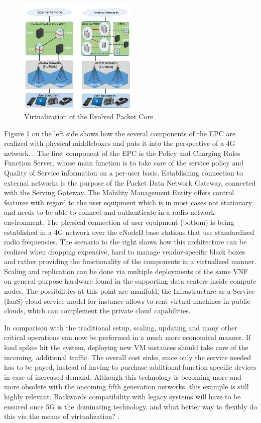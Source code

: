 \begin{figure}[h]
	\centering
	\includegraphics[width=0.5\textwidth]{images/epc_virt.png}
	\caption{Virtualization of the Evolved Packet Core \cite{mijumbi2016network}}
	\label{img:epc_virt}
\end{figure}

Figure \ref{img:epc_virt} on the left side shows how the several components of the EPC are realized with physical middleboxes and puts it into the perspective of a 4G network. . The first component of the EPC is the Policy and Charging Rules Function Server, whose main function is to take care of the service policy and Quality of Service information on a per-user basis. Establishing connection to external networks is the purpose of the Packet Data Network Gateway, connected with the Serving Gateway. The Mobility Management Entity offers control features with regard to the user equipment which is in most cases not stationary and needs to be able to connect and authenticate in a radio network environment. The physical connection of user equipment (bottom) is being established in a 4G network over the eNodeB base stations that use standardized radio frequencies.
The scenario to the right shows how this architecture can be realized when dropping expensive, hard to manage vendor-specific black boxes and rather providing the functionality of the components in a virtualized manner. Scaling and replication can be done via multiple deployments of the same VNF on general purpose hardware found in the supporting data centers inside compute nodes. The possibilities at this point are manifold, the Infrastructure as a Service (IaaS) cloud service model for instance allows to rent virtual machines in public clouds, which can complement the private cloud capabilities. 

In comparison with the traditional setup, scaling, updating and many other critical operations can now be performed in a much more economical manner. If load spikes hit the system, deploying new VM instances should take care of the incoming, additional traffic. The overall cost sinks, since only the service needed has to be payed, instead of having to purchase additional function specific devices in case of increased demand. Although this technology is becoming more and more obsolete with the oncoming fifth generation networks, this example is still highly relevant. Backwards compatibility with legacy systems will have to be ensured once 5G is the dominating technology, and what better way to flexibly do this via the means of virtualization? \cite{4g} \cite{mijumbi2016network}. 

